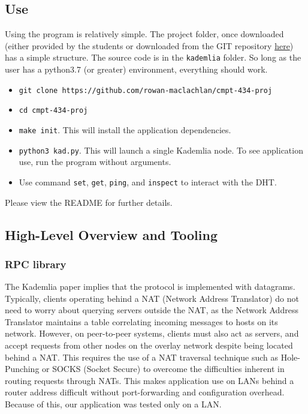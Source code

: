 \documentclass[12pt]{report}
\newcommand{\code}[1]{\colorbox{codegray}{\texttt{#1}}}
\begin{document}
        \subsection{Use}
            Using the program is relatively simple.  The project folder, once
            downloaded (either provided by the students or downloaded from the
            GIT repository
            \href{https://github.com/rowan-maclachlan/cmpt-434-proj}{here}) has
            a simple structure.  The source code is in the \code{kademlia}
            folder.  So long as the user has a python3.7 (or greater)
            environment, everything should work.
            \begin{itemize}
                \item \code{git clone
                    https://github.com/rowan-maclachlan/cmpt-434-proj}
                \item \code{cd cmpt-434-proj}
                \item \code{make init}. This will install the application
                    dependencies.
                \item \code{python3 kad.py}.  This will launch a single
                    Kademlia node.  To see application use, run the program
                    without arguments.
                \item Use command \code{set}, \code{get}, \code{ping}, and
                    \code{inspect} to interact with the DHT.
            \end{itemize}
            Please view the README for further details.
        \subsection{High-Level Overview and Tooling}
            \subsubsection{RPC library}
                The Kademlia paper implies that the protocol is implemented
                with datagrams\cite{kademlia}.  Typically, clients operating
                behind a NAT (Network Address Translator) do not need to worry
                about querying servers outside the NAT, as the Network Address
                Translator maintains a table correlating incoming messages to
                hosts on its network.  However, on peer-to-peer systems,
                clients must also act as servers, and accept requests from
                other nodes on the overlay network despite being located behind
                a NAT.  This requires the use of a NAT traversal technique such
                as Hole-Punching or SOCKS (Socket Secure) to overcome the
                difficulties inherent in routing requests through NATs.  This
                makes application use on LANs behind a router address difficult
                without port-forwarding and configuration overhead.  Because of
                this, our application was tested only on a LAN.
\end{document}
